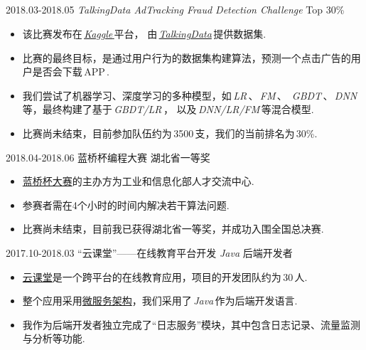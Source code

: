 \documentclass[letterpaper,AutoFakeBold]{twentysecondcv} %
\begin{document}
\begin{CJK*}{UTF8}{gbsn}
\newpage %
\makeprofile %

\begin{CJK*}{UTF8}{gkai}
\section{}
\end{CJK*}

2018.03-2018.05 \quad \emph{TalkingData AdTracking Fraud Detection Challenge} \hfill Top 30\%
\begin{itemize}
	\setlength{\itemsep}{0pt}
	\setlength{\parsep}{0pt}
	\setlength{\parskip}{0pt}
	\item 该比赛发布在\,\href{https://www.kaggle.com/c/talkingdata-adtracking-fraud-detection#description}{\emph{Kaggle}\,}平台，
	由\,\href{https://www.talkingdata.com/}{\emph{TalkingData}}\,提供数据集.
	\item 比赛的最终目标，是通过用户行为的数据集构建算法，预测一个点击广告的用户是否会下载\,APP\,.
	\item 我们尝试了机器学习、深度学习的多种模型，如\,\emph{LR}\,、\,\emph{FM}\,、
	\,\emph{GBDT}\,、\,\emph{DNN}\,等，最终构建了基于\,\emph{GBDT/LR}\,，
	以及\,\emph{DNN/LR/FM}\,等混合模型.
	\item 比赛尚未结束，目前参加队伍约为\,3500\,支，我们的当前排名为\,30\%.
\end{itemize}

2018.04-2018.06 \qquad  蓝桥杯编程大赛 \hfill 湖北省一等奖
\begin{itemize}
	\setlength{\itemsep}{0pt}
	\setlength{\parsep}{0pt}
	\setlength{\parskip}{0pt}
	\item \href{http://dasai.lanqiao.cn/}{蓝桥杯大赛}的主办方为工业和信息化部人才交流中心.
	\item 参赛者需在4个小时的时间内解决若干算法问题.
	\item 比赛尚未结束，目前我已获得湖北省一等奖，并成功入围全国总决赛.
\end{itemize}

2017.10-2018.03 \qquad “云课堂”——在线教育平台开发 \hfill \emph{Java} 后端开发者
\begin{itemize}
	\setlength{\itemsep}{0pt}
	\setlength{\parsep}{0pt}
	\setlength{\parskip}{0pt}
	\item \href{https://www.dxtwangxiao.com/#/overview}{云课堂}是一个跨平台的在线教育应用，项目的开发团队约为\,30\,人.
	\item 整个应用采用\href{https://en.wikipedia.org/wiki/Microservices}{微服务架构}，我们采用了\,\emph{Java}\,作为后端开发语言.
	\item 我作为后端开发者独立完成了“日志服务”模块，其中包含日志记录、流量监测与分析等功能.
\end{itemize}


\end{CJK*}
\end{document}

